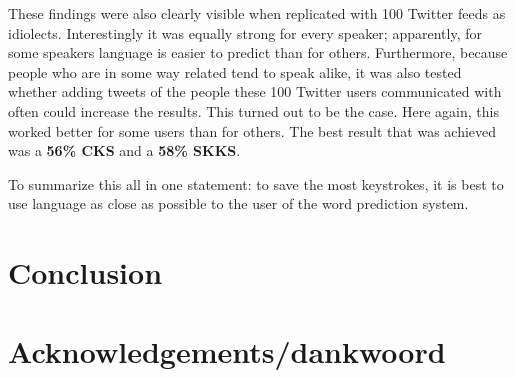 \documentclass[12pt]{article}
\let\stdsection\section
\renewcommand\section{\newpage\stdsection}
\begin{document}
These findings were also clearly visible when replicated with 100 Twitter feeds as idiolects. Interestingly it was equally strong for every speaker; apparently, for some speakers language is easier to predict than for others. Furthermore, because people who are in some way related tend to speak alike, it was also tested whether adding tweets of the people these 100 Twitter users communicated with often could increase the results. This turned out to be the case. Here again, this worked better for some users than for others. The best result that was achieved was a \textbf{56\% CKS} and a \textbf{58\% SKKS}.

To summarize this all in one statement: to save the most keystrokes, it is best to use language as close as possible to the user of the word prediction system.

\section{Conclusion} \label{conclusion}

\section{Acknowledgements/dankwoord}


{}

\end{document}
